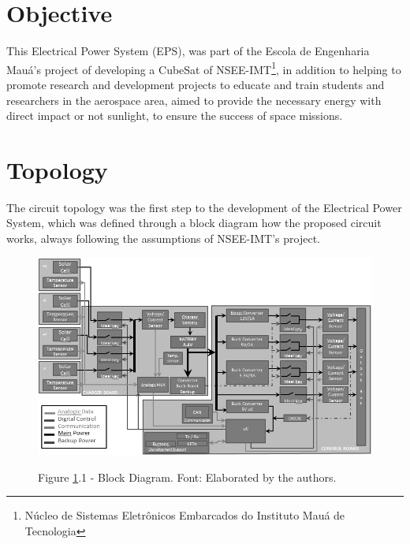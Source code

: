 \documentclass[3p]{elsarticle}
\begin{document}

\section{Objective}
\label{Objective}

	This Electrical Power System (EPS), was part of the Escola de Engenharia Mau\'{a}'s project of developing a CubeSat of NSEE-IMT\footnote{N\'{u}cleo de Sistemas Eletr\^{o}nicos Embarcados do Instituto Mau\'{a} de Tecnologia}, in addition to helping to promote research and development projects to educate and train students and researchers in the aerospace area, aimed to provide the necessary energy with direct impact or not sunlight, to ensure the success of space missions.
	
\section{Topology}
\label{Topologia}

	The circuit topology was the first step to the development of the Electrical Power System, which was defined through a block diagram how the proposed circuit works, always following the assumptions of NSEE-IMT's project.\cite{Corsi}

	\begin{figure}[th]
		\label{Fig_diag}
		\centering
		\includegraphics[width=0.6\linewidth]{./figs/diag}
			
		\begin{small}
		Figure \ref{Fig_diag}.1 - Block Diagram. Font: Elaborated by the authors.
		\end{small}		
	\end{figure}
	
	
	
\end{document}
